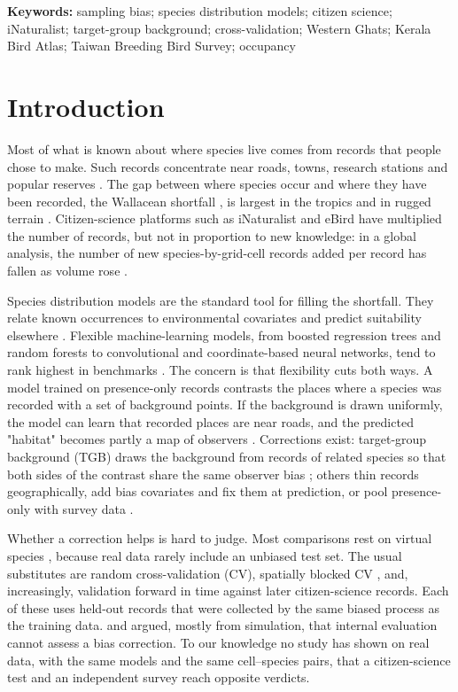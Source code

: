 \documentclass[11pt]{article}
\begin{document}
\noindent\textbf{Keywords:} sampling bias; species distribution models; citizen science; iNaturalist; target-group background; cross-validation; Western Ghats; Kerala Bird Atlas; Taiwan Breeding Bird Survey; occupancy

\section{Introduction}

Most of what is known about where species live comes from records that people chose to make. Such records concentrate near roads, towns, research stations and popular reserves \citep{reddy2003,boakes2010,meyer2015,hughes2021}. The gap between where species occur and where they have been recorded, the Wallacean shortfall \citep{hortal2015}, is largest in the tropics and in rugged terrain \citep{amano2016,oliver2021}. Citizen-science platforms such as iNaturalist and eBird have multiplied the number of records, but not in proportion to new knowledge: in a global analysis, the number of new species-by-grid-cell records added per record has fallen as volume rose \citep{oliver2021}.

Species distribution models are the standard tool for filling the shortfall. They relate known occurrences to environmental covariates and predict suitability elsewhere \citep{elith2006,guisan2013}. Flexible machine-learning models, from boosted regression trees and random forests to convolutional and coordinate-based neural networks, tend to rank highest in benchmarks \citep{elith2006,valavi2022,deneu2021,cole2023,ryckewaert2025}. The concern is that flexibility cuts both ways. A model trained on presence-only records contrasts the places where a species was recorded with a set of background points. If the background is drawn uniformly, the model can learn that recorded places are near roads, and the predicted "habitat" becomes partly a map of observers \citep{phillips2009,kramerschadt2013}. Corrections exist: target-group background (TGB) draws the background from records of related species so that both sides of the contrast share the same observer bias \citep{phillips2009}; others thin records geographically, add bias covariates and fix them at prediction, or pool presence-only with survey data \citep{fourcade2014,fithian2015,warton2013,inman2021,isaac2020}.

Whether a correction helps is hard to judge. Most comparisons rest on virtual species \citep{inman2021,baker2024}, because real data rarely include an unbiased test set. The usual substitutes are random cross-validation (CV), spatially blocked CV \citep{ploton2020,valavi2019}, and, increasingly, validation forward in time against later citizen-science records. Each of these uses held-out records that were collected by the same biased process as the training data. \citet{elgabbas2018} and \citet{baker2024} argued, mostly from simulation, that internal evaluation cannot assess a bias correction. To our knowledge no study has shown on real data, with the same models and the same cell--species pairs, that a citizen-science test and an independent survey reach opposite verdicts.
\end{document}

